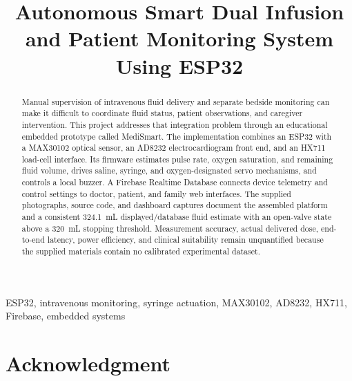 \documentclass[conference]{IEEEtran}
\begin{document}
\title{Autonomous Smart Dual Infusion and Patient Monitoring System Using ESP32}
\author{
}
\maketitle

\begin{abstract}
Manual supervision of intravenous fluid delivery and separate bedside monitoring can make it difficult to coordinate fluid status, patient observations, and caregiver intervention. This project addresses that integration problem through an educational embedded prototype called MediSmart.
The implementation combines an ESP32 with a MAX30102 optical sensor, an AD8232 electrocardiogram front end, and an HX711 load-cell interface. Its firmware estimates pulse rate, oxygen saturation, and remaining fluid volume, drives saline, syringe, and oxygen-designated servo mechanisms, and controls a local buzzer. A Firebase Realtime Database connects device telemetry and control settings to doctor, patient, and family web interfaces.
The supplied photographs, source code, and dashboard captures document the assembled platform and a consistent 324.1~mL displayed/database fluid estimate with an open-valve state above a 320~mL stopping threshold. Measurement accuracy, actual delivered dose, end-to-end latency, power efficiency, and clinical suitability remain unquantified because the supplied materials contain no calibrated experimental dataset.
\end{abstract}
\begin{IEEEkeywords}
ESP32, intravenous monitoring, syringe actuation, MAX30102, AD8232, HX711, Firebase, embedded systems
\end{IEEEkeywords}








\section*{Acknowledgment}
\ProjectAcknowledgment



\end{document}
